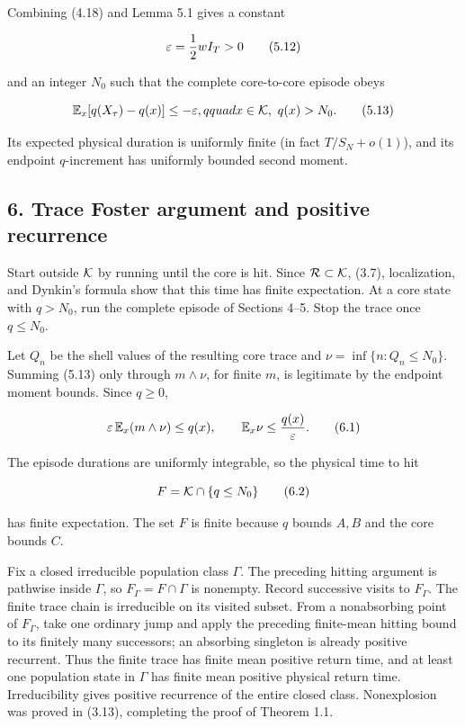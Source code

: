 Combining (4.18) and Lemma 5.1 gives a constant

\[
 \varepsilon={1\over2}wI_T>0                               \tag{5.12}
\]

and an integer \(N_0\) such that the complete core-to-core episode obeys

\[
 \mathbb E_x[q(X_\tau)-q(x)]\le-\varepsilon,qquad
 x\in{\cal K},\ q(x)>N_0.                                 \tag{5.13}
\]

Its expected physical duration is uniformly finite (in fact
\(T/S_N+o(1)\)), and its endpoint \(q\)-increment has uniformly bounded
second moment.

\subsection{6. Trace Foster argument and positive
recurrence}

Start outside \({\cal K}\) by running until the core is hit. Since
\({\cal R}\subset{\cal K}\), (3.7), localization, and Dynkin's formula
show that this time has finite expectation. At a core state with
\(q>N_0\), run the complete episode of Sections 4--5. Stop the trace
once \(q\le N_0\).

Let \(Q_n\) be the shell values of the resulting core trace and
\(\nu=\inf\{n:Q_n\le N_0\}\). Summing (5.13) only through
\(m\wedge\nu\), for finite \(m\), is legitimate by the endpoint moment
bounds. Since \(q\ge0\),

\[
 \varepsilon\,\mathbb E_x(m\wedge\nu)\le q(x),
 \qquad
 \mathbb E_x\nu\le {q(x)\over\varepsilon}.                 \tag{6.1}
\]

The episode durations are uniformly integrable, so the physical time to
hit

\[
 F={\cal K}\cap\{q\le N_0\}                                \tag{6.2}
\]

has finite expectation. The set \(F\) is finite because \(q\) bounds
\(A,B\) and the core bounds \(C\).

Fix a closed irreducible population class \(\Gamma\). The preceding
hitting argument is pathwise inside \(\Gamma\), so
\(F_\Gamma=F\cap\Gamma\) is nonempty. Record successive visits to
\(F_\Gamma\). The finite trace chain is irreducible on its visited
subset. From a nonabsorbing point of \(F_\Gamma\), take one ordinary
jump and apply the preceding finite-mean hitting bound to its finitely
many successors; an absorbing singleton is already positive recurrent.
Thus the finite trace has finite mean positive return time, and at least
one population state in \(\Gamma\) has finite mean positive physical
return time. Irreducibility gives positive recurrence of the entire
closed class. Nonexplosion was proved in (3.13), completing the proof of
Theorem 1.1.

